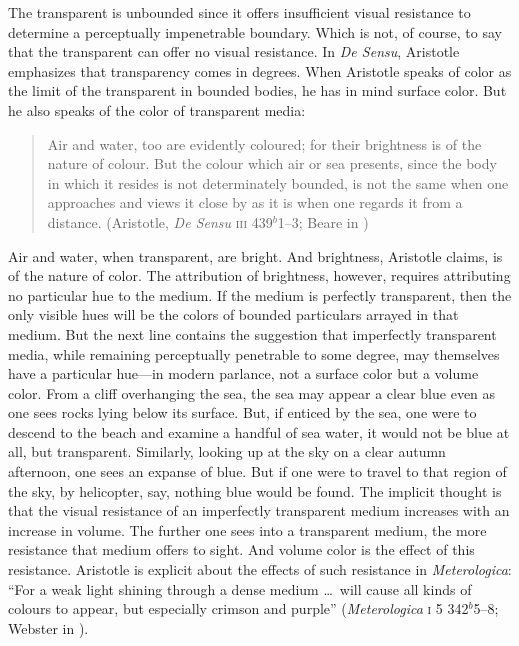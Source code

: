 The transparent is unbounded since it offers insufficient visual resistance to determine a perceptually impenetrable boundary. Which is not, of course, to say that the transparent can offer no visual resistance. In \emph{De Sensu}, Aristotle emphasizes that transparency comes in degrees. When Aristotle speaks of color as the limit of the transparent in bounded bodies, he has in mind surface color. But he also speaks of the color of transparent media:
\begin{quote}
    Air and water, too are evidently coloured; for their brightness is of the nature of colour. But the colour which air or sea presents, since the body in which it resides is not determinately bounded, is not the same when one approaches and views it close by as it is when one regards it from a distance. (Aristotle, \emph{De Sensu} \textsc{iii} 439\( ^{b} \)1--3; Beare in \citealt[7]{Barnes:1984uq})
\end{quote}
Air and water, when transparent, are bright. And brightness, Aristotle claims, is of the nature of color. The attribution of brightness, however, requires attributing no particular hue to the medium. If the medium is perfectly transparent, then the only visible hues will be the colors of bounded particulars arrayed in that medium. But the next line contains the suggestion that imperfectly transparent media, while remaining perceptually penetrable to some degree, may themselves have a particular hue---in modern parlance, not a surface color but a volume color. From a cliff overhanging the sea, the sea may appear a clear blue even as one sees rocks lying below its surface. But, if enticed by the sea, one were to descend to the beach and examine a handful of sea water, it would not be blue at all, but transparent. Similarly, looking up at the sky on a clear autumn afternoon, one sees an expanse of blue. But if one were to travel to that region of the sky, by helicopter, say, nothing blue would be found. The implicit thought is that the visual resistance of an imperfectly transparent medium increases with an increase in volume. The further one sees into a transparent medium, the more resistance that medium offers to sight. And volume color is the effect of this resistance. Aristotle is explicit about the effects of such resistance in \emph{Meterologica}: ``For a weak light shining through a dense medium \ldots\ will cause all kinds of colours to appear, but especially crimson and purple'' (\emph{Meterologica} \textsc{i} 5 342\( ^{b} \)5--8; Webster in \citealt[8--9]{Barnes:1984uq}).

